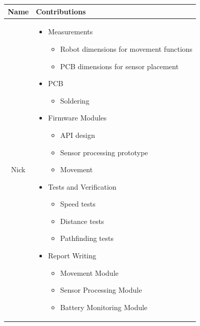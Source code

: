 \documentclass[conference]{IEEEtran}
\begin{document}
\bgroup
\def\arraystretch{1.5}
\begin{tabularx}{\linewidth}{ | c | X | }
	\hline
	Name & Contributions                 \\
	\hline
	Nick & \begin{itemize}
		       \item Measurements
		             \begin{itemize}
			      \item Robot dimensions for movement functions
			      \item PCB dimensions for sensor placement
		      \end{itemize}
		       \item PCB
		             \begin{itemize}
			      \item Soldering
		      \end{itemize}
		       \item Firmware Modules
		             \begin{itemize}
			      \item API design
			      \item Sensor processing prototype
			      \item Movement
		      \end{itemize}
		       \item Tests and Verification
		             \begin{itemize}
			      \item Speed tests
			      \item Distance tests
			      \item Pathfinding tests
		      \end{itemize}
		       \item Report Writing
		             \begin{itemize}
			      \item Movement Module
			      \item Sensor Processing Module
			      \item Battery Monitoring Module
		      \end{itemize}
	       \end{itemize} \\
	\hline
\end{tabularx}
\end{document}
